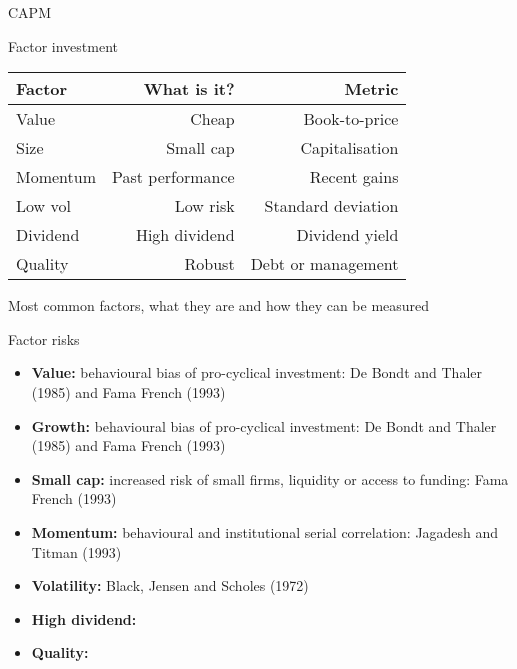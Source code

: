 \documentclass[14pt,xcolor=pdftex,dvipsnames,table]{beamer}\usepackage[]{graphicx}\usepackage[]{color}
\begin{document}
\begin{frame}{CAPM}
\end{frame}

\begin{frame}{Factor investment}
\begin{table}
\begin{center}
\begin{tabular}{l r r }
\textbf{Factor} & \textbf{What is it?} & \textbf{Metric} \\
\hline
Value & Cheap & Book-to-price\\
Size & Small cap & Capitalisation\\
Momentum & Past performance & Recent gains\\
Low vol & Low risk & Standard deviation\\
Dividend & High dividend & Dividend yield\\
Quality & Robust & Debt or management\\
\end{tabular}
\end{center}
\end{table}
Most common factors, what they are and how they can be measured
\end{frame}

\begin{frame}{Factor risks}
\begin{itemize}[<+-| alert@+>]
\pause
  \item \textbf{Value:} behavioural bias of pro-cyclical investment: De Bondt and Thaler (1985) and Fama French (1993)
\item \textbf{Growth:} behavioural bias of pro-cyclical investment: De Bondt and Thaler (1985) and Fama French (1993)
\item \textbf{Small cap:} increased risk of small firms, liquidity or access to funding: Fama French (1993)
\item \textbf{Momentum:} behavioural and institutional serial correlation: Jagadesh and Titman (1993)
\item \textbf{Volatility:} Black, Jensen and Scholes (1972)
\item \textbf{High dividend:}
\item \textbf{Quality:} 
\end{itemize}
\end{frame}
\end{document}
